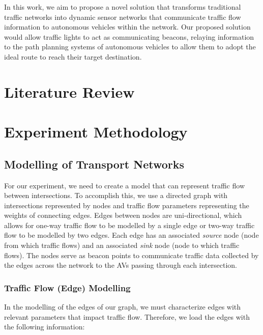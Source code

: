 \documentclass[conference]{IEEEtran}
\begin{document}
In this work, we aim to propose a novel solution that transforms traditional traffic networks into dynamic sensor networks that communicate traffic flow information to autonomous vehicles within the network. Our proposed solution would allow traffic lights to act as communicating beacons, relaying information to the path planning systems of autonomous vehicles to allow them to adopt the ideal route to reach their target destination.

\section{Literature Review}
\section{Experiment Methodology}

\subsection{Modelling of Transport Networks}\label{sec:modelling}

For our experiment, we need to create a model that can represent traffic flow between intersections. To accomplish this, we use a directed graph with intersections represented by nodes and traffic flow parameters representing the weights of connecting edges. Edges between nodes are uni-directional, which allows for one-way traffic flow to be modelled by a single edge or two-way traffic flow to be modelled by two edges. Each edge has an associated \textit{source} node (node from which traffic flows) and an associated \textit{sink} node (node to which traffic flows). The nodes serve as beacon points to communicate traffic data collected by the edges across the network to the AVs passing through each intersection.

\subsubsection{Traffic Flow (Edge) Modelling}\label{sec:edge}

In the modelling of the edges of our graph, we must characterize edges with relevant parameters that impact traffic flow. Therefore, we load the edges with the following information:
\end{document}
